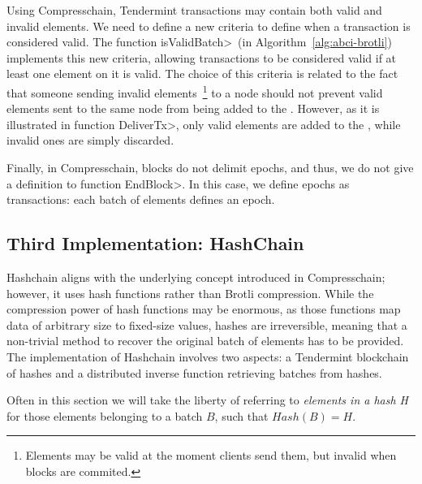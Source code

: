 Using Compresschain, Tendermint transactions may contain both valid
and invalid elements.
%
We need to define a new criteria to define when a transaction is
considered valid.
%
The function \<isValidBatch>~(in Algorithm~\ref{alg:abci-brotli})
implements this new criteria, allowing transactions to be considered valid if at
least one element on it is valid.
%
The choice of this criteria is related to the fact that someone sending invalid
elements~\footnote{Elements may be valid at the moment clients send them, but
invalid when blocks are commited.} to a node should not prevent valid
elements sent to the same node from being added to the \setchain.
%
However, as it is illustrated in function \<DeliverTx>, only valid
elements are added to the \setchain, while invalid ones are simply discarded.

Finally, in Compresschain, blocks do not delimit epochs, and thus, we do not
give a definition to function \<EndBlock>.
%
In this case, we define epochs as transactions: each batch of elements defines an
epoch.

\subsection{Third Implementation: HashChain}\label{subsec:hashchain}
%
Hashchain aligns with the underlying concept introduced in Compresschain;
however, it uses hash functions rather than Brotli compression.
%
While the compression power of hash functions may be enormous, as those
functions map data of arbitrary size to fixed-size values, hashes are
irreversible, meaning that a non-trivial method to recover the original batch of elements
has to be provided.
%
The implementation of Hashchain involves two aspects: a Tendermint blockchain of
hashes and a distributed inverse function retrieving batches from hashes.
%

Often in this section we will take the liberty of referring to \textit{elements
in a hash H} for those elements belonging to a batch $B$, such that
$Hash(B) = H$.


